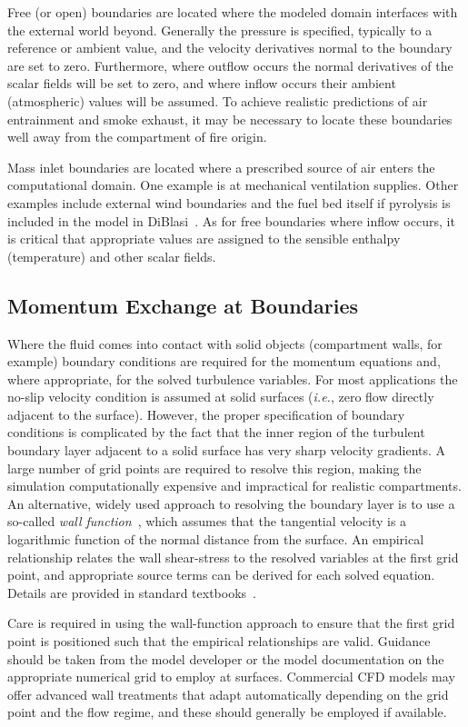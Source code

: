 \documentclass[graybox]{svmult}
\begin{document}
Free (or open) boundaries are located where the modeled domain interfaces with the external world beyond. Generally the pressure is specified, typically to a reference or ambient value, and the velocity derivatives normal to the boundary are set to zero. Furthermore, where outflow occurs the normal derivatives of the scalar fields will be set to zero, and where inflow occurs their ambient (atmospheric) values will be assumed. To achieve realistic predictions of air entrainment and smoke exhaust, it may be necessary to locate these boundaries well away from the compartment of fire origin.

Mass inlet boundaries are located where a prescribed source of air enters the computational domain. One example is at mechanical ventilation supplies. Other examples include external wind boundaries and the fuel bed itself if pyrolysis is included in the model in DiBlasi~\cite{DiBlasi}. As for free boundaries where inflow occurs, it is critical that appropriate values are assigned to the sensible enthalpy (temperature) and other scalar fields.

\subsection{Momentum Exchange at Boundaries}

Where the fluid comes into contact with solid objects (compartment walls, for example) boundary conditions are required for the momentum equations and, where appropriate, for the solved turbulence variables. For most applications  the  no-slip  velocity  condition  is  assumed at solid surfaces ({\em i.e.}, zero flow directly adjacent to the surface). However, the proper specification of boundary conditions is complicated by the fact that the inner region of the turbulent boundary layer adjacent to a solid surface has very sharp velocity gradients. A large number of grid points are required to resolve this region, making the simulation computationally expensive and impractical for realistic compartments. An alternative, widely used approach to resolving the boundary layer is to use a so-called {\em wall function}~\cite{Launder}, which assumes that the tangential velocity is a logarithmic function of the normal distance from the surface. An empirical relationship relates the wall shear-stress to the resolved variables at the first grid point, and appropriate source terms can be derived for each solved equation. Details are provided in standard textbooks~\cite{Wilcox}.

Care is required in using the wall-function approach to ensure that the first grid point is positioned such that the empirical relationships are valid. Guidance should be taken from the model developer or the model documentation on the appropriate numerical grid to employ at surfaces. Commercial CFD models may offer advanced wall treatments that adapt automatically depending on the grid point and the flow regime, and these should generally be employed if available.
\end{document}
